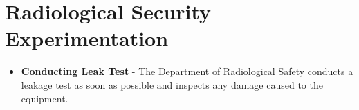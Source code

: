 \section{Radiological Security Experimentation}

\begin{itemize}
    \item \textbf{Conducting Leak Test} - The Department of Radiological Safety conducts a leakage test as soon as possible and inspects any damage caused to the equipment.
\end{itemize}